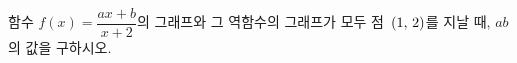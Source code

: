 \hspace*{2mm}\begin{minipage}[t]{\dimexpr\linewidth-2mm\relax}\vspace{0pt}
함수 $f(x)=\dfrac{ax+b}{x+2}$의 그래프와 그 역함수의 그래프가 모두 점~$(1,\mkern3mu 2)$를 지날 때, $ab$의 값을 구하시오. \end{minipage}
